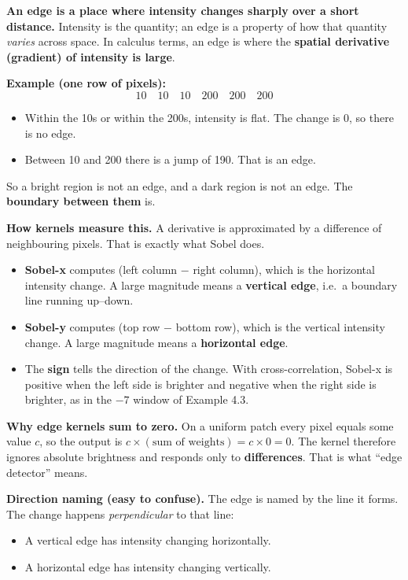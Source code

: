 \textbf{An edge is a place where intensity changes sharply over a short distance.} Intensity is the quantity; an edge is a property of how that quantity \emph{varies} across space. In calculus terms, an edge is where the \textbf{spatial derivative (gradient) of intensity is large}.

\textbf{Example (one row of pixels):}
\[
10 \quad 10 \quad 10 \quad 200 \quad 200 \quad 200
\]
\begin{itemize}[nosep]
  \item Within the 10s or within the 200s, intensity is flat. The change is 0, so there is no edge.
  \item Between 10 and 200 there is a jump of 190. That is an edge.
\end{itemize}
So a bright region is not an edge, and a dark region is not an edge. The \textbf{boundary between them} is.

\textbf{How kernels measure this.} A derivative is approximated by a difference of neighbouring pixels. That is exactly what Sobel does.
\begin{itemize}[nosep]
  \item \textbf{Sobel-x} computes (left column $-$ right column), which is the horizontal intensity change. A large magnitude means a \textbf{vertical edge}, i.e.\ a boundary line running up--down.
  \item \textbf{Sobel-y} computes (top row $-$ bottom row), which is the vertical intensity change. A large magnitude means a \textbf{horizontal edge}.
  \item The \textbf{sign} tells the direction of the change. With cross-correlation, Sobel-x is positive when the left side is brighter and negative when the right side is brighter, as in the $-7$ window of Example 4.3.
\end{itemize}

\textbf{Why edge kernels sum to zero.} On a uniform patch every pixel equals some value $c$, so the output is $c \times (\text{sum of weights}) = c \times 0 = 0$. The kernel therefore ignores absolute brightness and responds only to \textbf{differences}. That is what ``edge detector'' means.

\textbf{Direction naming (easy to confuse).} The edge is named by the line it forms. The change happens \emph{perpendicular} to that line:
\begin{itemize}[nosep]
  \item A vertical edge has intensity changing horizontally.
  \item A horizontal edge has intensity changing vertically.
\end{itemize}

